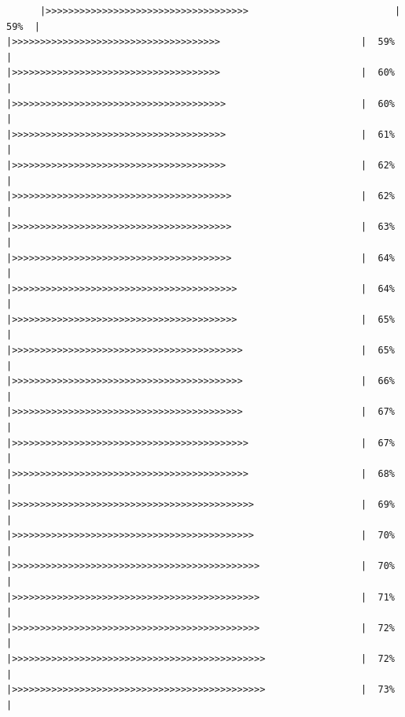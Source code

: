 \documentclass[
]{book}
\begin{document}
\begin{verbatim}
      |>>>>>>>>>>>>>>>>>>>>>>>>>>>>>>>>>>>>                          |  59%  |                                                                      |>>>>>>>>>>>>>>>>>>>>>>>>>>>>>>>>>>>>>                         |  59%  |                                                                      |>>>>>>>>>>>>>>>>>>>>>>>>>>>>>>>>>>>>>                         |  60%  |                                                                      |>>>>>>>>>>>>>>>>>>>>>>>>>>>>>>>>>>>>>>                        |  60%  |                                                                      |>>>>>>>>>>>>>>>>>>>>>>>>>>>>>>>>>>>>>>                        |  61%  |                                                                      |>>>>>>>>>>>>>>>>>>>>>>>>>>>>>>>>>>>>>>                        |  62%  |                                                                      |>>>>>>>>>>>>>>>>>>>>>>>>>>>>>>>>>>>>>>>                       |  62%  |                                                                      |>>>>>>>>>>>>>>>>>>>>>>>>>>>>>>>>>>>>>>>                       |  63%  |                                                                      |>>>>>>>>>>>>>>>>>>>>>>>>>>>>>>>>>>>>>>>                       |  64%  |                                                                      |>>>>>>>>>>>>>>>>>>>>>>>>>>>>>>>>>>>>>>>>                      |  64%  |                                                                      |>>>>>>>>>>>>>>>>>>>>>>>>>>>>>>>>>>>>>>>>                      |  65%  |                                                                      |>>>>>>>>>>>>>>>>>>>>>>>>>>>>>>>>>>>>>>>>>                     |  65%  |                                                                      |>>>>>>>>>>>>>>>>>>>>>>>>>>>>>>>>>>>>>>>>>                     |  66%  |                                                                      |>>>>>>>>>>>>>>>>>>>>>>>>>>>>>>>>>>>>>>>>>                     |  67%  |                                                                      |>>>>>>>>>>>>>>>>>>>>>>>>>>>>>>>>>>>>>>>>>>                    |  67%  |                                                                      |>>>>>>>>>>>>>>>>>>>>>>>>>>>>>>>>>>>>>>>>>>                    |  68%  |                                                                      |>>>>>>>>>>>>>>>>>>>>>>>>>>>>>>>>>>>>>>>>>>>                   |  69%  |                                                                      |>>>>>>>>>>>>>>>>>>>>>>>>>>>>>>>>>>>>>>>>>>>                   |  70%  |                                                                      |>>>>>>>>>>>>>>>>>>>>>>>>>>>>>>>>>>>>>>>>>>>>                  |  70%  |                                                                      |>>>>>>>>>>>>>>>>>>>>>>>>>>>>>>>>>>>>>>>>>>>>                  |  71%  |                                                                      |>>>>>>>>>>>>>>>>>>>>>>>>>>>>>>>>>>>>>>>>>>>>                  |  72%  |                                                                      |>>>>>>>>>>>>>>>>>>>>>>>>>>>>>>>>>>>>>>>>>>>>>                 |  72%  |                                                                      |>>>>>>>>>>>>>>>>>>>>>>>>>>>>>>>>>>>>>>>>>>>>>                 |  73%  |                                                                      
\end{verbatim}
\end{document}
